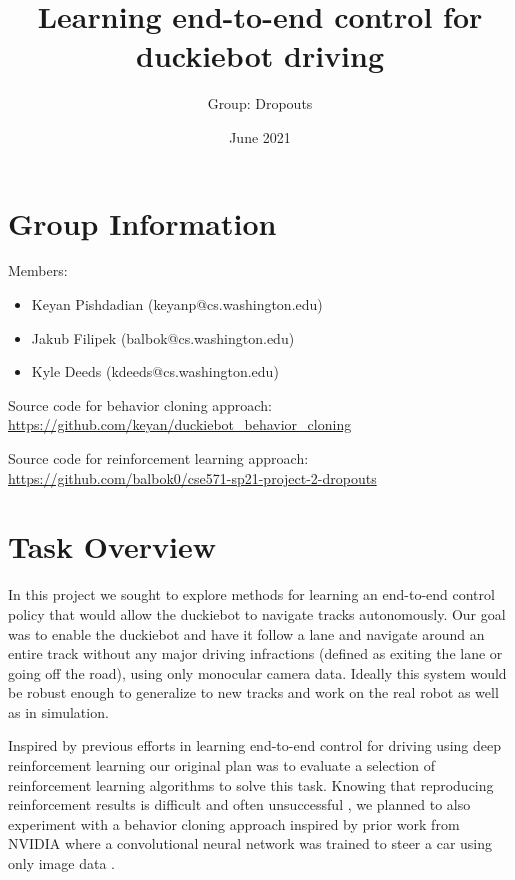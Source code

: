 \documentclass{article}
\title{Learning end-to-end control for duckiebot driving}
\author{Group: Dropouts}
\date{June 2021}
\begin{document}
\maketitle

\section{Group Information}

Members:
\begin{itemize}
    \item Keyan Pishdadian (keyanp@cs.washington.edu)
    \item Jakub Filipek (balbok@cs.washington.edu)
    \item Kyle Deeds (kdeeds@cs.washington.edu)
\end{itemize}

\noindent Source code for behavior cloning approach:
\newline
\url{https://github.com/keyan/duckiebot_behavior_cloning}

\noindent Source code for reinforcement learning approach:
\newline
\url{https://github.com/balbok0/cse571-sp21-project-2-dropouts}

\section{Task Overview}

In this project we sought to explore methods for learning an end-to-end control policy that would allow the duckiebot to navigate tracks autonomously. Our goal was to enable the duckiebot and have it follow a lane and navigate around an entire track without any major driving infractions (defined as exiting the lane or going off the road), using only monocular camera data. Ideally this system would be robust enough to generalize to new tracks and work on the real robot as well as in simulation.

Inspired by previous efforts in learning end-to-end control for driving using deep reinforcement learning \cite{DBLP:journals/corr/abs-1807-00412} our original plan was to evaluate a selection of reinforcement learning algorithms to solve this task. Knowing that reproducing reinforcement results is difficult and often unsuccessful \cite{henderson2019deep}, we planned to also experiment with a behavior cloning approach inspired by prior work from NVIDIA where a convolutional neural network was trained to steer a car using only image data \cite{DBLP:journals/corr/BojarskiTDFFGJM16}.
\end{document}
